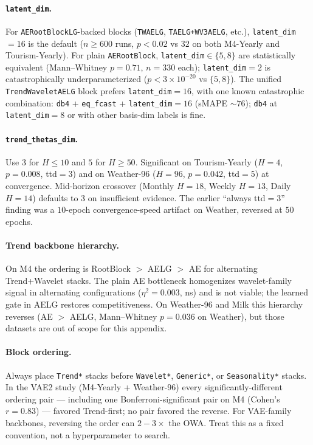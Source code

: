 \documentclass{article}
\begin{document}
\paragraph{\texttt{latent\_dim}.} For \texttt{AERootBlockLG}-backed blocks (\texttt{TWAELG}, \texttt{TAELG+WV3AELG}, etc.), \texttt{latent\_dim}$=16$ is the default ($n\geq 600$ runs, $p<0.02$ vs $32$ on both M4-Yearly and Tourism-Yearly). For plain \texttt{AERootBlock}, \texttt{latent\_dim}$\in\{5, 8\}$ are statistically equivalent (Mann--Whitney $p=0.71$, $n=330$ each); \texttt{latent\_dim}$=2$ is catastrophically underparameterized ($p<3\times 10^{-20}$ vs $\{5, 8\}$). The unified \texttt{TrendWaveletAELG} block prefers \texttt{latent\_dim}$=16$, with one known catastrophic combination: \texttt{db4} + \texttt{eq\_fcast} + \texttt{latent\_dim}$=16$ (sMAPE $\sim 76$); \texttt{db4} at \texttt{latent\_dim}$=8$ or with other basis-dim labels is fine.

\paragraph{\texttt{trend\_thetas\_dim}.} Use $3$ for $H \le 10$ and $5$ for $H \ge 50$. Significant on Tourism-Yearly ($H=4$, $p=0.008$, ttd$=3$) and on Weather-96 ($H=96$, $p=0.042$, ttd$=5$) at convergence. Mid-horizon crossover (Monthly $H=18$, Weekly $H=13$, Daily $H=14$) defaults to $3$ on insufficient evidence. The earlier ``always ttd$=3$'' finding was a $10$-epoch convergence-speed artifact on Weather, reversed at $50$ epochs.

\paragraph{Trend backbone hierarchy.} On M4 the ordering is RootBlock $>$ AELG $>$ AE for alternating Trend+Wavelet stacks. The plain AE bottleneck homogenizes wavelet-family signal in alternating configurations ($\eta^2 = 0.003$, ns) and is not viable; the learned gate in AELG restores competitiveness. On Weather-96 and Milk this hierarchy reverses (AE $>$ AELG, Mann--Whitney $p=0.036$ on Weather), but those datasets are out of scope for this appendix.

\paragraph{Block ordering.} Always place \texttt{Trend*} stacks before \texttt{Wavelet*}, \texttt{Generic*}, or \texttt{Seasonality*} stacks. In the VAE2 study (M4-Yearly + Weather-96) every significantly-different ordering pair --- including one Bonferroni-significant pair on M4 (Cohen's $r=0.83$) --- favored Trend-first; no pair favored the reverse. For VAE-family backbones, reversing the order can $2{-}3\times$ the OWA. Treat this as a fixed convention, not a hyperparameter to search.
\end{document}
